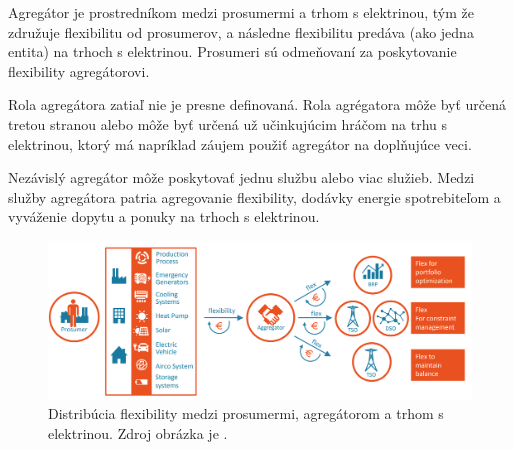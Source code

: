 Agregátor je prostredníkom medzi prosumermi a trhom s elektrinou, tým že združuje flexibilitu od prosumerov, a následne flexibilitu predáva (ako jedna entita) na trhoch s elektrinou. Prosumeri sú odmeňovaní za poskytovanie flexibility agregátorovi.

Rola agregátora zatiaľ nie je presne definovaná. Rola agrégatora môže byť určená tretou stranou alebo môže byť určená už učinkujúcim hráčom na trhu s elektrinou, ktorý má napríklad záujem použiť agregátor na doplňujúce veci.

Nezávislý agregátor môže poskytovať jednu službu alebo viac služieb. Medzi služby agregátora patria agregovanie flexibility, dodávky energie spotrebiteľom a vyváženie dopytu a ponuky na trhoch s elektrinou. \cite{Granado2023}
















\begin{figure}[H]
    \includegraphics[width=\textwidth]{images/prosumers_aggregator.png}
    \centering
    \caption[Funkcie agregátora flexibility]{Distribúcia flexibility medzi prosumermi, agregátorom a trhom s elektrinou. Zdroj obrázka je \cite{usef2018}.}
    \end{figure}


